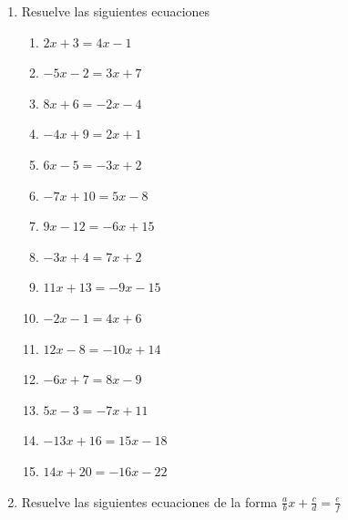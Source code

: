 \documentclass[12pt]{article}
\begin{document}
\begin{enumerate}
\def\labelenumi{\arabic{enumi}.}
\item
  Resuelve las siguientes ecuaciones

  \begin{enumerate}
  \def\labelenumii{\roman{enumii}.}
  \item
    \(2x + 3 = 4x - 1\)
  \item
    \(-5x - 2 = 3x + 7\)
  \item
    \(8x + 6 = -2x - 4\)
  \item
    \(-4x + 9 = 2x + 1\)
  \item
    \(6x - 5 = -3x + 2\)
  \item
    \(-7x + 10 = 5x - 8\)
  \item
    \(9x - 12 = -6x + 15\)
  \item
    \(-3x + 4 = 7x + 2\)
  \item
    \(11x + 13 = -9x - 15\)
  \item
    \(-2x - 1 = 4x + 6\)
  \item
    \(12x - 8 = -10x + 14\)
  \item
    \(-6x + 7 = 8x - 9\)
  \item
    \(5x - 3 = -7x + 11\)
  \item
    \(-13x + 16 = 15x - 18\)
  \item
    \(14x + 20 = -16x - 22\)
  \end{enumerate}
\item
  Resuelve las siguientes ecuaciones de la forma
  \(\frac{a}{b}x+\frac{c}{d}=\frac{e}{f}\)


\end{enumerate}
\end{document}
